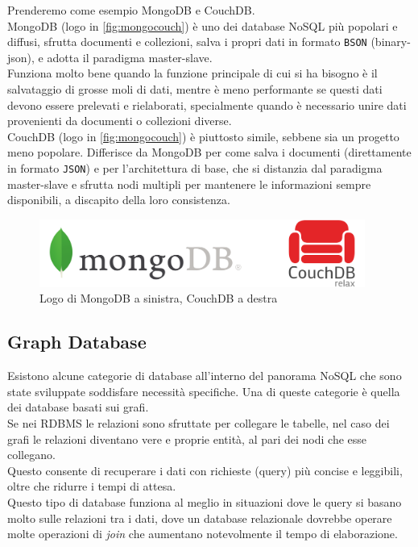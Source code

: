 \noindent Prenderemo come esempio MongoDB\cite{site:udemymongodb} e CouchDB\cite{site:udemycouchdb}.\\
MongoDB (logo in \autoref{fig:mongocouch}) è uno dei database NoSQL più popolari e diffusi, sfrutta documenti e collezioni, salva i propri dati in formato \texttt{BSON} (binary-json), e adotta il paradigma \gls{master-slave}.\\
Funziona molto bene quando la funzione principale di cui si ha bisogno è il salvataggio di grosse moli di dati, mentre è meno performante se questi dati devono essere prelevati e rielaborati, specialmente quando è necessario unire dati provenienti da documenti o collezioni diverse.\\
CouchDB (logo in \autoref{fig:mongocouch}) è piuttosto simile, sebbene sia un progetto meno popolare. Differisce da MongoDB per come salva i documenti (direttamente in formato \texttt{JSON}) e per l'architettura di base, che si distanzia dal paradigma \gls{master-slave} e sfrutta nodi multipli per mantenere le informazioni sempre disponibili, a discapito della loro consistenza.

\begin{figure}[htbp]
\begin{center}
\includegraphics[height=6em]{immagini/tecnologies-logos/MongoDB-CouchDB-Logo.png}
\caption{Logo di MongoDB a sinistra, CouchDB a destra}
\label{fig:mongocouch}
\end{center}
\end{figure}

\subsection{Graph Database}
Esistono alcune categorie di database all'interno del panorama NoSQL che sono state sviluppate soddisfare necessità specifiche. Una di queste categorie è quella dei database basati sui grafi.\\
Se nei RDBMS le relazioni sono sfruttate per collegare le tabelle, nel caso dei grafi le relazioni diventano vere e proprie entità, al pari dei nodi che esse collegano.\\
Questo consente di recuperare i dati con richieste (query) più concise e leggibili, oltre che ridurre i tempi di attesa.\\
Questo tipo di database funziona al meglio in situazioni dove le query si basano molto sulle relazioni tra i dati, dove un database relazionale dovrebbe operare molte operazioni di \textit{join} che aumentano notevolmente il tempo di elaborazione.\\

